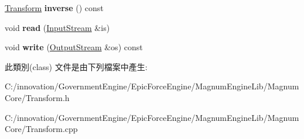 \begin{DoxyCompactItemize}
\item 
\hyperlink{class_i_dream_sky_1_1_transform}{Transform} {\bfseries inverse} () const \hypertarget{class_i_dream_sky_1_1_transform_a2f541623721570442976504241009d49}{}\label{class_i_dream_sky_1_1_transform_a2f541623721570442976504241009d49}

\item 
void {\bfseries read} (\hyperlink{class_i_dream_sky_1_1_input_stream}{Input\+Stream} \&is)\hypertarget{class_i_dream_sky_1_1_transform_a441ea015ed03e3823780c60bdfd10136}{}\label{class_i_dream_sky_1_1_transform_a441ea015ed03e3823780c60bdfd10136}

\item 
void {\bfseries write} (\hyperlink{class_i_dream_sky_1_1_output_stream}{Output\+Stream} \&os) const \hypertarget{class_i_dream_sky_1_1_transform_ac6fac139249f7002f3a6e08230e63f0a}{}\label{class_i_dream_sky_1_1_transform_ac6fac139249f7002f3a6e08230e63f0a}

\end{DoxyCompactItemize}


此類別(class) 文件是由下列檔案中產生\+:\begin{DoxyCompactItemize}
\item 
C\+:/innovation/\+Government\+Engine/\+Epic\+Force\+Engine/\+Magnum\+Engine\+Lib/\+Magnum\+Core/Transform.\+h\item 
C\+:/innovation/\+Government\+Engine/\+Epic\+Force\+Engine/\+Magnum\+Engine\+Lib/\+Magnum\+Core/Transform.\+cpp\end{DoxyCompactItemize}
